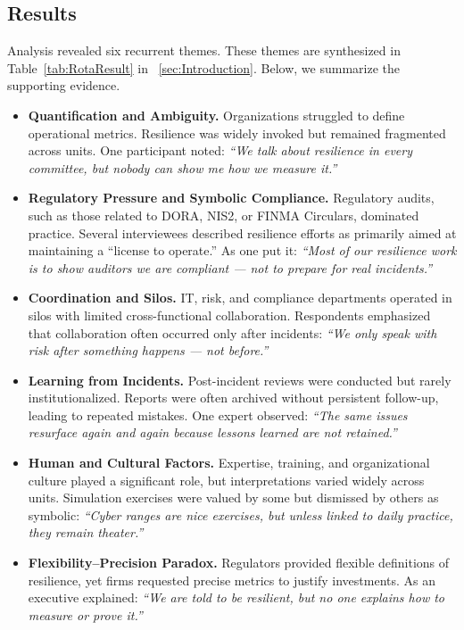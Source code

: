 \subsection{Results}
Analysis revealed six recurrent themes. These themes are synthesized in Table~\ref{tab:RotaResult} in ~\ref{sec:Introduction}. Below, we summarize the supporting evidence.

\begin{itemize}
    \item \textbf{Quantification and Ambiguity.} Organizations struggled to define operational metrics. Resilience was widely invoked but remained fragmented across units. One participant noted: \textit{“We talk about resilience in every committee, but nobody can show me how we measure it.”}
    
    \item \textbf{Regulatory Pressure and Symbolic Compliance.} Regulatory audits, such as those related to DORA, NIS2, or FINMA Circulars, dominated practice. Several interviewees described resilience efforts as primarily aimed at maintaining a “license to operate.” As one put it: \textit{“Most of our resilience work is to show auditors we are compliant — not to prepare for real incidents.”}
    
    \item \textbf{Coordination and Silos.} IT, risk, and compliance departments operated in silos with limited cross-functional collaboration. Respondents emphasized that collaboration often occurred only after incidents: \textit{“We only speak with risk after something happens — not before.”}
    
    \item \textbf{Learning from Incidents.} Post-incident reviews were conducted but rarely institutionalized. Reports were often archived without persistent follow-up, leading to repeated mistakes. One expert observed: \textit{“The same issues resurface again and again because lessons learned are not retained.”}
    
    \item \textbf{Human and Cultural Factors.} Expertise, training, and organizational culture played a significant role, but interpretations varied widely across units. Simulation exercises were valued by some but dismissed by others as symbolic: \textit{“Cyber ranges are nice exercises, but unless linked to daily practice, they remain theater.”}
    
    \item \textbf{Flexibility–Precision Paradox.} Regulators provided flexible definitions of resilience, yet firms requested precise metrics to justify investments. As an executive explained: \textit{“We are told to be resilient, but no one explains how to measure or prove it.”}\\
\end{itemize}

